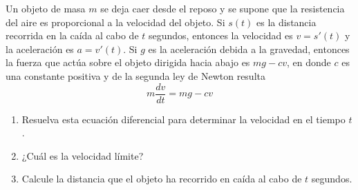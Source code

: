 \item Un objeto de masa $m$ se deja caer desde el reposo y se supone que la resistencia del aire es proporcional a la velocidad del objeto. Si $s(t)$ es la distancia recorrida en la caída al cabo de $t$ segundos, entonces la velocidad es $v = s'(t)$ y la aceleración es $a = v'(t)$. Si $g$ es la aceleración debida a la gravedad, entonces la fuerza que actúa sobre el objeto dirigida hacia abajo es $mg - cv$, en donde $c$ es una constante positiva y de la segunda ley de Newton resulta
    \[ m \frac{dv}{dt} = mg - cv \]
    \begin{enumerate}
        \item[(a)] Resuelva esta ecuación diferencial para determinar la velocidad en el tiempo $t$.
        \item[(b)] ¿Cuál es la velocidad límite?
        \item[(c)] Calcule la distancia que el objeto ha recorrido en caída al cabo de $t$ segundos.
    \end{enumerate}
